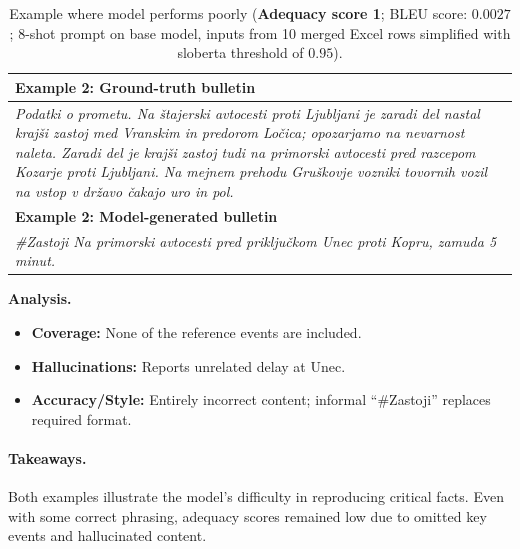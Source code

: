 \documentclass[fleqn,moreauthors,10pt]{ds_report}
\begin{document}
\vspace{1em}

\begin{table}[!ht]
\centering
\footnotesize
\renewcommand{\arraystretch}{1.15}
\setlength{\tabcolsep}{4pt}
\begin{tabularx}{\linewidth}{@{}X@{}}
\toprule
\textbf{Example 2: Ground-truth bulletin} \\
\midrule
\textit{Podatki o prometu. Na štajerski avtocesti proti Ljubljani je zaradi del nastal krajši zastoj med Vranskim in predorom Ločica; opozarjamo na nevarnost naleta. Zaradi del je krajši zastoj tudi na primorski avtocesti pred razcepom Kozarje proti Ljubljani. Na mejnem prehodu Gruškovje vozniki tovornih vozil na vstop v državo čakajo uro in pol.} \\
\midrule
\textbf{Example 2: Model-generated bulletin} \\
\midrule
\textit{\#Zastoji Na primorski avtocesti pred priključkom Unec proti Kopru, zamuda 5 minut.} \\
\bottomrule
\end{tabularx}
\caption{Example where model performs poorly (\textbf{Adequacy score 1}; BLEU score: $0.0027$; 8-shot prompt on base model, inputs from 10 merged Excel rows simplified with sloberta threshold of $0.95$).}

\end{table}

\FloatBarrier            %
\noindent \textbf{Analysis.}
\begin{itemize}[noitemsep, topsep=0pt]
  \item \textbf{Coverage:} None of the reference events are included.
  \item \textbf{Hallucinations:} Reports unrelated delay at Unec.
  \item \textbf{Accuracy/Style:} Entirely incorrect content; informal “\#Zastoji” replaces required format.
\end{itemize}

\paragraph{Takeaways.}  
Both examples illustrate the model's difficulty in reproducing critical facts. Even with some correct phrasing, adequacy scores remained low due to omitted key events and hallucinated content.





\end{document}
